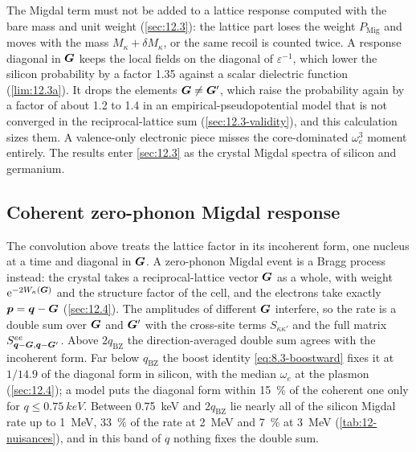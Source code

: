 The Migdal term must not be added to a lattice response computed with the bare mass and unit weight (\cref{sec:12.3}): the lattice part loses the weight $P_{\mathrm{Mig}}$ and moves with the mass $M_\kappa + \delta M_\kappa$, or the same recoil is counted twice. A response diagonal in $\bm{G}$ keeps the local fields on the diagonal of $\varepsilon^{-1}$, which lower the silicon probability by a factor 1.35 against a scalar dielectric function (\cref{lim:12.3a}). It drops the elements $\bm{G}\neq\bm{G}'$, which raise the probability again by a factor of about 1.2 to 1.4 in an empirical-pseudopotential model that is not converged in the reciprocal-lattice sum (\cref{sec:12.3-validity}), and this calculation sizes them. A valence-only electronic piece misses the core-dominated $\omega_e^3$ moment entirely. The results enter \cref{sec:12.3} as the crystal Migdal spectra of silicon and germanium.

\subsection{Coherent zero-phonon Migdal response}

The convolution above treats the lattice factor in its incoherent form, one nucleus at a time and diagonal in $\bm{G}$. A zero-phonon Migdal event is a Bragg process instead: the crystal takes a reciprocal-lattice vector $\bm{G}$ as a whole, with weight $\mathrm{e}^{-2W_\kappa(\bm{G})}$ and the structure factor of the cell, and the electrons take exactly $\bm{p} = \bm{q} - \bm{G}$ (\cref{sec:12.4}). The amplitudes of different $\bm{G}$ interfere, so the rate is a double sum over $\bm{G}$ and $\bm{G}'$ with the cross-site terms $S_{\kappa\kappa'}$ and the full matrix $S^{ee}_{\bm{q}-\bm{G},\bm{q}-\bm{G}'}$. Above $2q_{\mathrm{BZ}}$ the direction-averaged double sum agrees with the incoherent form. Far below $q_{\mathrm{BZ}}$ the boost identity \cref{eq:8.3-boostward} fixes it at $1/14.9$ of the diagonal form in silicon, with the median $\omega_e$ at the plasmon (\cref{sec:12.4}); a model puts the diagonal form within \SI{15}{\percent} of the coherent one only for $q \le \SI{0.75}{keV}$. Between \SI{0.75}{keV} and $2q_{\mathrm{BZ}}$ lie nearly all of the silicon Migdal rate up to \SI{1}{MeV}, \SI{33}{\percent} of the rate at \SI{2}{MeV} and \SI{7}{\percent} at \SI{3}{MeV} (\cref{tab:12-nuisances}), and in this band of $q$ nothing fixes the double sum.

